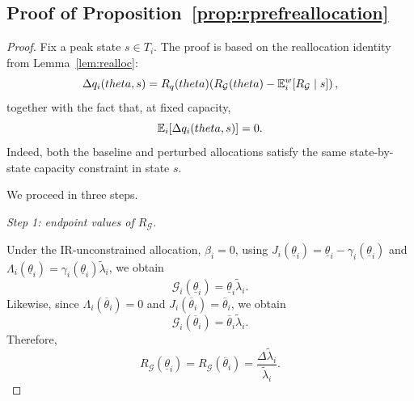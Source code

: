 \documentclass[master.tex]{subfiles}
\begin{document}

\subsection{Proof of Proposition~\ref{prop:rprefreallocation}}

\begin{proof}
Fix a peak state $s\in T_i$. The proof is based on the reallocation identity from Lemma~\ref{lem:realloc}:
\begin{equation}\label{eq:realloc-proof}
\Delta q_i(theta,s)
=
R_q(theta)\!\left(
R_{\mathcal G}(theta)-\mathbb{E}_i^w\!\left[R_{\mathcal G}\mid s\right]
\right),
\end{equation}
together with the fact that, at fixed capacity,
\begin{equation}\label{eq:mean-zero-proof}
\mathbb{E}_i[\Delta q_i(theta,s)]=0.
\end{equation}
Indeed, both the baseline and perturbed allocations satisfy the same state-by-state capacity constraint in state $s$.

We proceed in three steps.

\noindent\textit{Step 1: endpoint values of $R_{\mathcal G}$.}

Under the IR-unconstrained allocation, $\beta_i=0$, using $J_i(\underline\theta_i)=\underline\theta_i-\gamma_i(\underline\theta_i)$ and
$\Lambda_i(\underline\theta_i)=\gamma_i(\underline\theta_i)\tilde\lambda_i$, we obtain
\[
\mathcal G_i(\underline\theta_i)=\underline\theta_i\tilde\lambda_i.
\]
Likewise, since $\Lambda_i(\overline\theta_i)=0$ and $J_i(\overline\theta_i)=\overline\theta_i$, we obtain
\[
\mathcal G_i(\overline\theta_i)=\overline\theta_i\tilde\lambda_i.
\]
Therefore,
\begin{equation}\label{eq:endpoint-unconstrained}
R_{\mathcal G}(\underline\theta_i)
=
R_{\mathcal G}(\overline\theta_i)
=
\frac{\Delta\tilde\lambda_i}{\tilde\lambda_i}.
\end{equation}


\end{proof}
\end{document}
